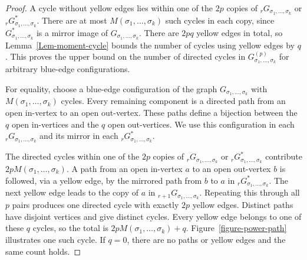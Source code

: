 \documentclass[12pt]{article}
\numberwithin{equation}{section}
\theoremstyle{plain}
\begin{document}
\begin{proof}
A cycle without yellow edges lies within one of the $2p$ copies of ${}_rG_{\sigma_1,\ldots,\sigma_k}$ or ${}_rG^*_{\sigma_1,\ldots,\sigma_k}$. There are at most $M(\sigma_1,\ldots,\sigma_k)$ such cycles in each copy, since $G^*_{\sigma_1,\ldots,\sigma_k}$ is a mirror image of $G_{\sigma_1,\ldots,\sigma_k}$. There are $2pq$ yellow edges in total, so Lemma~\ref{Lem-moment-cycle} bounds the number of cycles using yellow edges by $q$. This proves the upper bound on the number of directed cycles in $G^{(p)}_{\sigma_1,\ldots,\sigma_k}$ for arbitrary blue-edge configurations.

For equality, choose a blue-edge configuration of the graph $G_{\sigma_1,\ldots,\sigma_k}$ with $M(\sigma_1,\ldots,\sigma_k)$ cycles. Every remaining component is a directed path from an open in-vertex to an open out-vertex. These paths define a bijection between the $q$ open in-vertices and the $q$ open out-vertices. We use this configuration in each ${}_rG_{\sigma_1,\ldots,\sigma_k}$ and its mirror in each ${}_rG^*_{\sigma_1,\ldots,\sigma_k}$.

The directed cycles within one of the $2p$ copies of ${}_rG_{\sigma_1,\ldots,\sigma_k}$ or ${}_rG^*_{\sigma_1,\ldots,\sigma_k}$ contribute $2pM(\sigma_1,\ldots,\sigma_k)$. A path from an open in-vertex $a$ to an open out-vertex $b$ is followed, via a yellow edge, by the mirrored path from $b$ to $a$ in ${}_rG^*_{\sigma_1,\ldots,\sigma_k}$. The next yellow edge leads to the copy of $a$ in ${}_{r+1}G_{\sigma_1,\ldots,\sigma_k}$. Repeating this through all $p$ pairs produces one directed cycle with exactly $2p$ yellow edges. Distinct paths have disjoint vertices and give distinct cycles. Every yellow edge belongs to one of these $q$ cycles, so the total is $2pM(\sigma_1,\ldots,\sigma_k)+q$.
Figure~\ref{figure-power-path} illustrates one such cycle. If $q=0$, there are no paths or yellow edges and the same count holds.
\end{proof}
\end{document}
